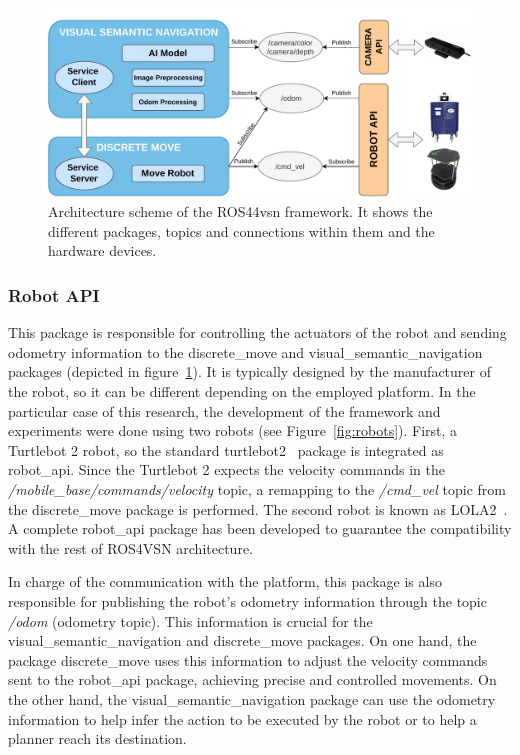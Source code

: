 \begin{figure}
    \centering
    \includegraphics[width=\linewidth]{figures/ros4vsn/arquitectura_paper}
    \caption{Architecture scheme of the ROS44\acrshort{vsn} framework.
    It shows the different packages, topics and connections within them and the hardware devices.}
    \label{fig:arch_scheme}
\end{figure}

\subsubsection{Robot API}\label{subsubsec:robot-api2}

This package is responsible for controlling the actuators of the robot and sending odometry information to the discrete\_move and visual\_semantic\_navi\-gation packages (depicted in figure~\ref{fig:arch_scheme}).
It is typically designed by the manufacturer of the robot, so it can be different depending on the employed platform.
In the particular case of this research, the development of the framework and experiments were done using two robots (see Figure~\ref{fig:robots}).
First, a Turtlebot 2 robot, so the standard turtlebot2~\cite{kobuki} package is integrated as robot\_api.
Since the Turtlebot 2 expects the velocity commands in the \textit{/mobile\_base/commands/velocity} topic, a remapping to the \textit{/cmd\_vel} topic from the discrete\_move package is performed.
The second robot is known as LOLA2~\cite{LOLA}.
A complete robot\_api package has been developed to guarantee the compatibility with the rest of ROS4VSN architecture.

In charge of the communication with the platform, this package is also responsible for publishing the robot's odometry information through the topic \textit{/odom} (odometry topic).
This information is crucial for the visual\_seman\-tic\_navigation and discrete\_move packages.
On one hand, the package discrete\_move uses this information to adjust the velocity commands sent to the robot\_api package, achieving precise and controlled movements.
On the other hand, the visual\_semantic\_navigation package can use the odometry information to help infer the action to be executed by the robot or to help a planner reach its destination.


